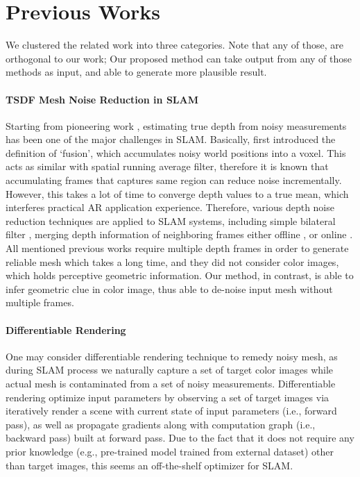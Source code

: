 \section{Previous Works}

We clustered the related work into three categories. Note that any of those, are orthogonal to our work; Our proposed method can take output from any of those methods as input, and able to generate more plausible result.

\paragraph{TSDF Mesh Noise Reduction in SLAM}
Starting from pioneering work \cite{curless1996volumetric}, 
estimating true depth from noisy measurements 
has been one of the major challenges in SLAM. 
Basically, \cite{curless1996volumetric} first introduced the definition of ‘fusion’, 
which accumulates noisy world positions into a voxel. 
This acts as similar with spatial running average filter, 
therefore it is known that accumulating frames 
that captures same region can reduce noise incrementally. 
However, this takes a lot of time to converge depth values 
to a true mean, which interferes practical AR application experience. 
Therefore, various depth noise reduction techniques are applied to SLAM systems, 
including simple bilateral filter \cite{newcombe2011kinectfusion},  merging depth information of neighboring frames either offline \cite{choi2015robust}\cite{zhou2018open3d}, or online \cite{cao2018real}\cite{yang2020noise}. 
All mentioned previous works require multiple depth frames 
in order to generate reliable mesh which takes a long time, 
and they did not consider color images, which holds perceptive geometric information. 
Our method, in contrast, is able to infer geometric clue in color image, 
thus able to de-noise input mesh without multiple frames.

\paragraph{Differentiable Rendering}
One may consider differentiable rendering technique to remedy noisy mesh, as during SLAM process we naturally capture a set of target color images while actual mesh is contaminated from a set of noisy measurements.
Differentiable rendering optimize input parameters by observing a set of target images via iteratively render a scene with current state of input parameters (i.e., forward pass), 
as well as propagate gradients along with computation graph (i.e., backward pass) built at forward pass. 
Due to the fact that it does not require any prior knowledge (e.g., pre-trained model trained from external dataset) other than target images, this seems an off-the-shelf optimizer for SLAM. 

